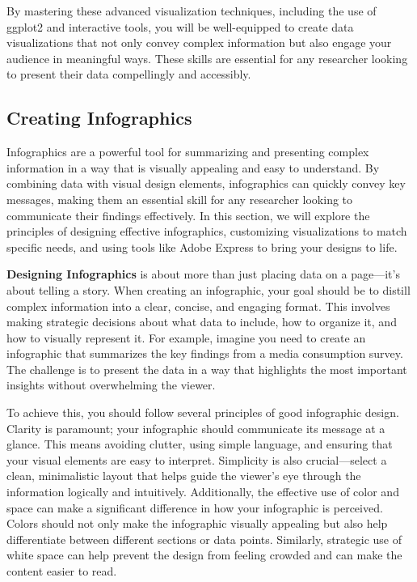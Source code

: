 \documentclass[
]{book}
\begin{document}
By mastering these advanced visualization techniques, including the use of ggplot2 and interactive tools, you will be well-equipped to create data visualizations that not only convey complex information but also engage your audience in meaningful ways. These skills are essential for any researcher looking to present their data compellingly and accessibly.

\subsection*{Creating Infographics}\label{creating-infographics}

Infographics are a powerful tool for summarizing and presenting complex information in a way that is visually appealing and easy to understand. By combining data with visual design elements, infographics can quickly convey key messages, making them an essential skill for any researcher looking to communicate their findings effectively. In this section, we will explore the principles of designing effective infographics, customizing visualizations to match specific needs, and using tools like Adobe Express to bring your designs to life.

\textbf{Designing Infographics} is about more than just placing data on a page---it's about telling a story. When creating an infographic, your goal should be to distill complex information into a clear, concise, and engaging format. This involves making strategic decisions about what data to include, how to organize it, and how to visually represent it. For example, imagine you need to create an infographic that summarizes the key findings from a media consumption survey. The challenge is to present the data in a way that highlights the most important insights without overwhelming the viewer.

To achieve this, you should follow several principles of good infographic design. Clarity is paramount; your infographic should communicate its message at a glance. This means avoiding clutter, using simple language, and ensuring that your visual elements are easy to interpret. Simplicity is also crucial---select a clean, minimalistic layout that helps guide the viewer's eye through the information logically and intuitively. Additionally, the effective use of color and space can make a significant difference in how your infographic is perceived. Colors should not only make the infographic visually appealing but also help differentiate between different sections or data points. Similarly, strategic use of white space can help prevent the design from feeling crowded and can make the content easier to read.
\end{document}
